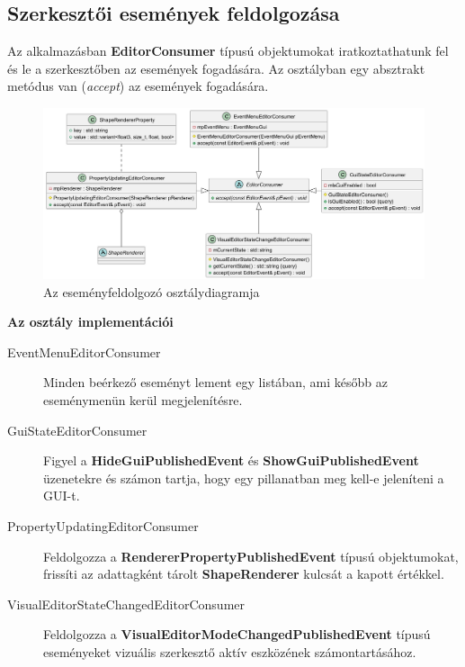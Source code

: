 \subsection{Szerkesztői események feldolgozása}

Az alkalmazásban \textbf{EditorConsumer} típusú objektumokat iratkoztathatunk fel és le a szerkesztőben az események fogadására. Az osztályban egy absztrakt metódus van (\textit{accept}) az események fogadására.

\begin{figure}[H]
	\centering
	\includegraphics[width=1\linewidth]{images/class_editor_consumer.png}
	\caption{Az eseményfeldolgozó osztálydiagramja}
	\label{fig:class_editor_consumer-1}
\end{figure}

\textbf{Az osztály implementációi}

\begin{description}
	\item[EventMenuEditorConsumer] Minden beérkező eseményt lement egy listában, ami később az eseménymenün kerül megjelenítésre.
	\item[GuiStateEditorConsumer] Figyel a \textbf{HideGuiPublishedEvent} és \textbf{ShowGuiPublishedEvent} üzenetekre és számon tartja, hogy egy pillanatban meg kell-e jeleníteni a GUI-t.
	\item[PropertyUpdatingEditorConsumer] Feldolgozza a \textbf{RendererPropertyPublishedEvent} típusú objektumokat, frissíti az adattagként tárolt \textbf{ShapeRenderer} kulcsát a kapott értékkel.
	\item[VisualEditorStateChangedEditorConsumer] Feldolgozza a \textbf{VisualEditorModeChangedPublishedEvent} típusú eseményeket vizuális szerkesztő aktív eszközének számontartásához.
\end{description}
